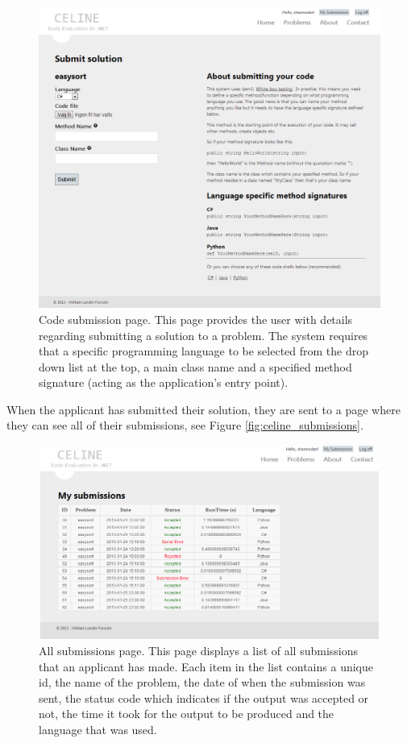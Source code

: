 \begin{figure}[h]
	\centering
	\includegraphics[width=1.0\textwidth]{chapters/media/celine_submit.png}
	\caption{Code submission page. This page provides the user with details regarding submitting a solution to a problem. The system requires that a specific programming language to be selected from the drop down list at the top, a main class name and a specified method signature (acting as the application's entry point).}
	\label{fig:celine_submit}
\end{figure}

When the applicant has submitted their solution, they are sent to a page where they can see all of their submissions, see Figure \ref{fig:celine_submissions}.

\begin{figure}[h]
	\centering
	\includegraphics[width=1.0\textwidth]{chapters/media/celine_submissionsCut.png}
	\caption{All submissions page. This page displays a list of all submissions that an applicant has made. Each item in the list contains a unique id, the name of the problem, the date of when the submission was sent, the status code which indicates if the output was accepted or not, the time it took for the output to be produced and the language that was used.}
	\label{fig:celine_submit}
\end{figure}



